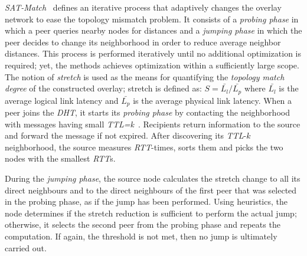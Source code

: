 \emph{SAT-Match}~\cite{RGJZ2004} defines an iterative process that 
adaptively changes the overlay network to ease the topology mismatch problem. 
It consists of a \emph{probing phase} in which a peer queries nearby nodes 
for distances and a \emph{jumping phase} in which the peer decides 
to change its neighborhood in order to reduce average neighbor distances. 
This process is performed iteratively
until no additional optimization is required; 
yet, the methods achieves optimization within a
sufficiently large scope.
The notion of \emph{stretch} is used as the means for quantifying 
the \emph{topology match degree} of the constructed overlay;
stretch is defined as: 
$S = \bar{L_l}/\bar{L_p}$ where $\bar{L_l}$ is the average logical link
latency and $\bar{L_p}$ is the average physical link latency.
% 
When a peer joins the \emph{DHT}, it starts 
its \emph{probing phase} by contacting the neighborhood with 
messages having small \emph{TTL=k}~\cite{jiang_lightflood_2008}. 
Recipients return information to the source and forward the message 
if not expired. 
After discovering its \emph{TTL}-$k$ neighborhood, 
the source measures \emph{RTT}-times, sorts them
and picks the two nodes with the smallest \emph{RTT}s.

During the \emph{jumping phase}, the source node calculates the 
stretch change to all its direct neighbours and to the direct neighbours
of the first peer that was selected in the probing phase, as if
the jump has been performed. 
Using heuristics, the node determines if the stretch
reduction is sufficient to perform the actual jump; 
otherwise, it selects the second peer from the probing phase 
and repeats the computation. If again, the
threshold is not met, then no jump is ultimately carried out.

